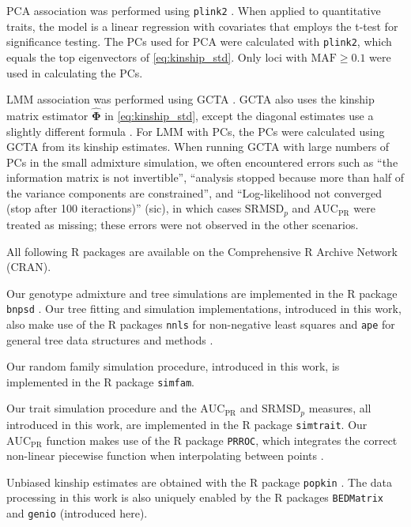 \documentclass[11pt]{article}
\newcommand{\rmsd}{\text{SRMSD}_p}
\newcommand{\auc}{\text{AUC}_\text{PR}}
\begin{document}
PCA association was performed using \texttt{plink2} \citep{chang_second-generation_2015}.
When applied to quantitative traits, the model is a linear regression with covariates that employs the t-test for significance testing.
The PCs used for PCA were calculated with \texttt{plink2}, which equals the top eigenvectors of \cref{eq:kinship_std}.
Only loci with $\text{MAF} \ge 0.1$ were used in calculating the PCs.

LMM association was performed using GCTA \citep{yang_gcta:_2011}.
GCTA also uses the kinship matrix estimator $\mathbf{\hat{\Phi}}$ in \cref{eq:kinship_std}, except the diagonal estimates use a slightly different formula \citep{yang_gcta:_2011}.
For LMM with PCs, the PCs were calculated using GCTA from its kinship estimates.
When running GCTA with large numbers of PCs in the small admixture simulation, we often encountered errors such as ``the information matrix is not invertible'', ``analysis stopped because more than half of the variance components are constrained'', and ``Log-likelihood not converged (stop after 100 iteractions)'' (sic), in which cases $\rmsd$ and $\auc$ were treated as missing;
these errors were not observed in the other scenarios.

All following R packages are available on the Comprehensive R Archive Network (CRAN).

Our genotype admixture and tree simulations are implemented in the R package \texttt{bnpsd} \citep{ochoa_estimating_2021}.
Our tree fitting and simulation implementations, introduced in this work, also make use of the R packages \texttt{nnls} for non-negative least squares \citep{mullen_nnls_2012} and \texttt{ape} for general tree data structures and methods \citep{paradis_ape_2019}.

Our random family simulation procedure, introduced in this work, is implemented in the R package \texttt{simfam}.

Our trait simulation procedure and the $\auc$ and $\rmsd$ measures, all introduced in this work, are implemented in the R package \texttt{simtrait}.
Our $\auc$ function makes use of the R package \texttt{PRROC}, which integrates the correct non-linear piecewise function when interpolating between points \citep{grau_prroc:_2015}.

Unbiased kinship estimates are obtained with the R package \texttt{popkin} \citep{ochoa_estimating_2021}.
The data processing in this work is also uniquely enabled by the R packages \texttt{BEDMatrix} \citep{grueneberg_bgdata_2019} and \texttt{genio} (introduced here).
\end{document}
